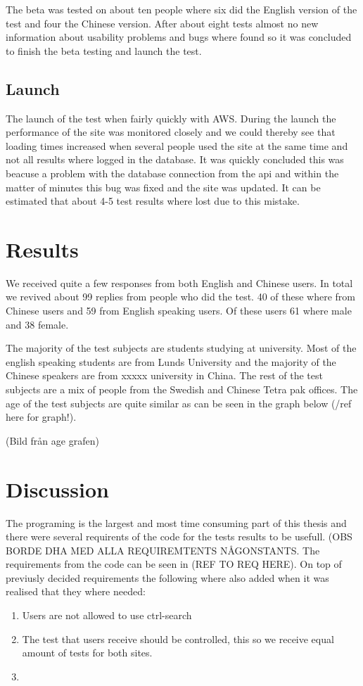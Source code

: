 The beta was tested on about ten people where six did the English version of the test and four the Chinese version. After about eight tests almost no new information about usability problems and bugs where found so it was concluded to finish the beta testing and launch the test.

\subsection{Launch}
The launch of the test when fairly quickly with AWS. During the launch the performance of the site was monitored closely and we could thereby see that loading times increased when several people used the site at the same time and not all results where logged in the database. It was quickly concluded this was beacuse a problem with the database connection from the api and within the matter of minutes this bug was fixed and the site was updated. It can be estimated that about 4-5 test results where lost due to this mistake.

\section{Results}
We received quite a few responses from both English and Chinese users. In total we revived about 99 replies from people who did the test. 40 of these where from Chinese users and 59 from English speaking users. Of these users 61 where male and 38 female.  
 
 The majority of the test subjects are students studying at university. Most of the english speaking students are from Lunds University and the majority of the Chinese speakers are from xxxxx university in China. The rest of the test subjects are a mix of people from the Swedish and Chinese Tetra pak offices.
 The age of the test subjects are quite similar as can be seen in the graph below (/ref here for graph!).
 
(Bild från age grafen)
 

\section{Discussion}
The programing is the largest and most time consuming part of this thesis and there were several requirents of the code for the tests results to be usefull. (OBS BORDE DHA MED ALLA REQUIREMTENTS NÅGONSTANTS. The requirements from the code can be seen in (REF TO REQ HERE). On top of previusly decided requirements the following where also added when it was realised that they where needed: 
 \begin{enumerate}
 	\item Users are not allowed to use ctrl-search
 	\item The test that users receive should be controlled, this so we receive equal amount of tests for both sites.
 	\item 
 \end{enumerate}

